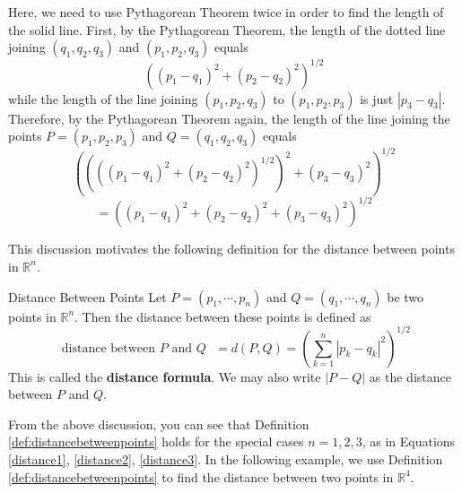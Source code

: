 Here, we need to use Pythagorean Theorem twice in order to find the length of 
the solid line. First, by the Pythagorean Theorem, the length of the dotted line joining $\left(
q_{1},q_{2},q_{3}\right) $ and $\left( p_{1},p_{2},q_{3}\right) $ equals
\begin{equation*}
\left( \left( p_{1}-q_{1}\right) ^{2}+\left( p_{2}-q_{2}\right) ^{2}\right)
^{1/2}
\end{equation*}
while the length of the line joining $\left( p_{1},p_{2},q_{3}\right) $ to 
$\left( p_{1},p_{2},p_{3}\right) $ is just $\left| p_{3}-q_{3}\right| .$
Therefore, by the Pythagorean Theorem again, the length of the line joining
the points $P = \left( p_{1},p_{2},p_{3}\right) $ and $Q = \left(
q_{1},q_{2},q_{3}\right) $ equals
\begin{equation*}
\left( \left( \left( \left( p_{1}-q_{1}\right) ^{2}+\left(
p_{2}-q_{2}\right) ^{2}\right) ^{1/2}\right) ^{2}+\left( p_{3}-q_{3}\right)
^{2}\right) ^{1/2}
\end{equation*}
\begin{equation}
 =\left( \left( p_{1}-q_{1}\right) ^{2}+\left( p_{2}-q_{2}\right)
^{2}+\left( p_{3}-q_{3}\right) ^{2}\right) ^{1/2}
\label{distance3}
\end{equation}

This discussion motivates the following definition for the distance between points in $\mathbb{R}^n$. 

\begin{definition}{Distance Between Points}\label{def:distancebetweenpoints}
Let $P=\left( p_{1},\cdots ,p_{n}\right) $ and 
$Q=\left( q_{1},\cdots ,q_{n}\right) $ be two points in 
$\mathbb{R}^{n}$. Then the distance
between these points is defined as
\begin{equation*}
\text{ distance between }P\text{ and } Q\text{ } = 
d( P, Q ) = \left( \sum_{k=1}^{n}\left\vert
p_{k}-q_{k}\right\vert ^{2}\right) ^{1/2}
\end{equation*}
This is called the \textbf{distance formula}. We may also write $\left\vert P - Q \right\vert $ as the distance between $P$ and $Q$.
\end{definition}

From the above discussion, you can see that Definition \ref{def:distancebetweenpoints} holds for the special cases $n=1,2,3$, as in 
Equations \ref{distance1}, \ref{distance2}, \ref{distance3}. 
In the following example, we use Definition \ref{def:distancebetweenpoints} to find the distance between two points in
$\mathbb{R}^4$.

